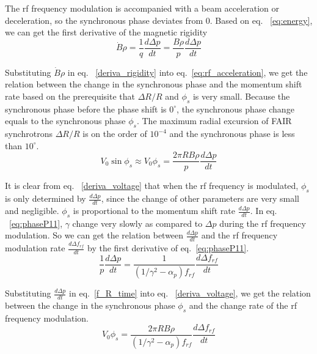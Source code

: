 \begin{itemize}
The rf frequency modulation is accompanied with a beam acceleration or deceleration, so the synchronous phase deviates from $0$. Based on eq. ~\ref{eq:energy}, we can get the first derivative of the magnetic rigidity
\begin{equation}
	\label{deriva_rigidity}
	\dot{B}\rho =\frac{1}{q}\frac{d \Delta p}{dt}=\frac{B\rho}{p}\frac{d \Delta p}{dt}
\end{equation}

Substituting $\dot{B}\rho$ in eq. ~\ref{deriva_rigidity} into eq.~\ref{eq:rf_acceleration}, we get the relation between the change in the synchronous phase and the momentum shift rate based on the prerequisite that $\Delta R/R$ and $\phi_s$ is very small. Because the synchronous phase before the phase shift is $0^\circ$, the synchronous phase change equals to the synchronous phase $\phi_{s}$. The maximum radial excursion of FAIR synchrotrons $\Delta R/R$ is on the order of $10^{-4}$ and the synchronous phase is less than $10^\circ$.
\begin{equation}
\label{deriva_voltage}
V_0\sin\phi_s\approx V_0\phi_s=\frac{2\pi R B\rho}{p} \frac{d \Delta p}{dt}
\end{equation} 

It is clear from eq. ~\ref{deriva_voltage} that when the rf frequency is modulated, $\phi_s$ is only determined by $\frac{d \Delta p}{dt}$, since the change of other parameters are very small and negligible. $\phi_s$ is proportional to the momentum shift rate $\frac{d \Delta p}{dt}$. In eq. ~\ref{eq:phaseP11}, $\gamma$ change very slowly as compared to $\Delta p$ during the rf frequency modulation. So we can get the relation between $\frac{d \Delta p}{dt}$ and the rf frequency modulation rate $\frac{d \Delta f_\mathit{rf}}{dt}$ by the first derivative of eq.~\ref{eq:phaseP11}. 
\begin{equation}
\label{f_R_time}
\frac{1}{p}\frac{d \Delta p}{dt}=\frac{1}{(1/\gamma^2-\alpha_p)f_\mathit{rf}}\frac{d \Delta f_\mathit{rf}}{dt}
\end{equation} 

Substituting $\frac{d \Delta p}{dt}$ in eq.~\ref{f_R_time} into eq. ~\ref{deriva_voltage}, we get the relation between the change in the synchronous phase $\phi_{s}$ and the change rate of the rf frequency modulation.
\begin{equation}
\label{syn_phase}
V_0\phi_s=\frac{2\pi R B\rho}{(1/\gamma^2-\alpha_p)f_\mathit{rf}} \frac{d \Delta f_\mathit{rf}}{dt}
\end{equation} 


\end{itemize}
